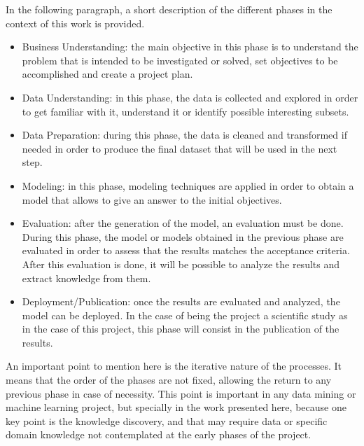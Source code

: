 In the following paragraph, a short description of the different phases in the context of this work is provided.

\begin{itemize}
    \item Business Understanding: the main objective in this phase is to understand the problem that is intended to be investigated or solved, set objectives to be accomplished and create a project plan.
    \item Data Understanding: in this phase, the data is collected and explored in order to get familiar with it, understand it or identify possible interesting subsets.
    \item Data Preparation: during this phase, the data is cleaned and transformed if needed in order to produce the final dataset that will be used in the next step.
    \item Modeling: in this phase, modeling techniques are applied in order to obtain a model that allows to give an answer to the initial objectives.
    \item Evaluation: after the generation of the model, an evaluation must be done. During this phase, the model or models obtained in the previous phase are evaluated in order to assess that the results matches the acceptance criteria. After this evaluation is done, it will be possible to analyze the results and extract knowledge from them.
    \item Deployment/Publication: once the results are evaluated and analyzed, the model can be deployed. In the case of being the project a scientific study as in the case of this project, this phase will consist in the publication of the results.
\end{itemize}

An important point to mention here is the iterative nature of the processes. It means that the order of the phases are not fixed, allowing the return to any previous phase in case of necessity.
This point is important in any data mining or machine learning project, but specially in the work presented here, because one key point is the knowledge discovery, and that may require data or specific domain knowledge not contemplated at the early phases of the project.
